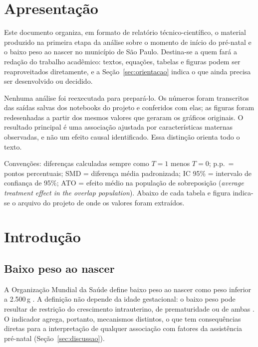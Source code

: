 \documentclass[11pt,a4paper]{article}
\begin{document}
\section*{Apresentação}

Este documento organiza, em formato de relatório técnico-científico, o material produzido
na primeira etapa da análise sobre o momento de início do pré-natal e o baixo peso ao
nascer no município de São Paulo. Destina-se a quem fará a redação do trabalho acadêmico:
textos, equações, tabelas e figuras podem ser reaproveitados diretamente, e a
Seção~\ref{sec:orientacao} indica o que ainda precisa ser desenvolvido ou decidido.

Nenhuma análise foi reexecutada para prepará-lo. Os números foram transcritos das saídas
salvas dos notebooks do projeto e conferidos com elas; as figuras foram redesenhadas a
partir dos mesmos valores que geraram os gráficos originais. O resultado principal é uma
associação ajustada por características maternas observadas, e não um efeito causal
identificado. Essa distinção orienta todo o texto.

Convenções: diferenças calculadas sempre como $T=1$ menos $T=0$; p.p.\ = pontos
percentuais; SMD = diferença média padronizada; IC 95\% = intervalo de confiança de 95\%;
ATO = efeito médio na população de sobreposição (\emph{average treatment effect in the
overlap population}). Abaixo de cada tabela e figura indica-se o arquivo do projeto de
onde os valores foram extraídos.

\section{Introdução}\label{sec:introducao}

\subsection{Baixo peso ao nascer}

A Organização Mundial da Saúde define baixo peso ao nascer como peso inferior a
2.500\,g \cite{who_lbw}. A definição não depende da idade gestacional: o baixo peso pode
resultar de restrição do crescimento intrauterino, de prematuridade ou de ambas
\cite{who_lbw}. O indicador agrega, portanto, mecanismos distintos, o que tem
consequências diretas para a interpretação de qualquer associação com fatores da
assistência pré-natal (Seção~\ref{sec:discussao}).
\end{document}
